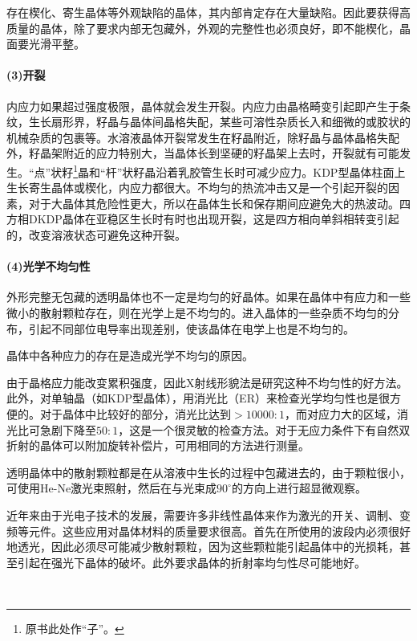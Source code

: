 存在楔化、寄生晶体等外观缺陷的晶体，其内部肯定存在大量缺陷。因此要获得高质量的晶体，除了要求内部无包藏外，外观的完整性也必须良好，即不能楔化，晶面要光滑平整。

\paragraph{(3)开裂}内应力如果超过强度极限，晶体就会发生开裂。内应力由晶格畸变引起即产生于条纹，生长扇形界，籽晶与晶体间晶格失配，某些可溶性杂质长入和细微的或胶状的机械杂质的包裹等。水溶液晶体开裂常发生在籽晶附近，除籽晶与晶体晶格失配外，籽晶架附近的应力特别大，当晶体长到坚硬的籽晶架上去时，开裂就有可能发生。“点”状籽\footnote{原书此处作“子”。}晶和“杆”状籽晶沿着乳胶管生长时可减少应力。KDP型晶体柱面上生长寄生晶体或楔化，内应力都很大。不均匀的热流冲击又是一个引起开裂的因素，对于大晶体其危险性更大，所以在晶体生长和保存期间应避免大的热波动。四方相DKDP晶体在亚稳区生长时有时也出现开裂，这是四方相向单斜相转变引起的，改变溶液状态可避免这种开裂。

\paragraph{(4)光学不均匀性}外形完整无包藏的透明晶体也不一定是均匀的好晶体。如果在晶体中有应力和一些微小的散射颗粒存在，则在光学上是不均匀的。进入晶体的一些杂质不均匀的分布，引起不同部位电导率出现差别，使该晶体在电学上也是不均匀的。

晶体中各种应力的存在是造成光学不均匀的原因。

由于晶格应力能改变累积强度，因此X射线形貌法是研究这种不均匀性的好方法。此外，对单轴晶（如KDP型晶体），用消光比（ER）来检查光学均匀性也是很方便的。对于晶体中比较好的部分，消光比达到$>10000:1$，而对应力大的区域，消光比可急剧下降至$50:1$，这是一个很灵敏的检查方法。对于无应力条件下有自然双折射的晶体可以附加旋转补偿片，可用相同的方法进行测量。

透明晶体中的散射颗粒都是在从溶液中生长的过程中包藏进去的，由于颗粒很小，可使用He-Ne激光束照射，然后在与光束成$90^\circ$的方向上进行超显微观察。

近年来由于光电子技术的发展，需要许多非线性晶体来作为激光的开关、调制、变频等元件。这些应用对晶体材料的质量要求很高。首先在所使用的波段内必须很好地透光，因此必须尽可能减少散射颗粒，因为这些颗粒能引起晶体中的光损耗，甚至引起在强光下晶体的破坏。此外要求晶体的折射率均匀性尽可能地好。

~\\

